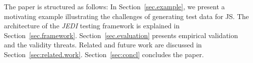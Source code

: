 The paper is structured as follows: In Section~\ref{sec.example}, we present a motivating example illustrating the challenges of generating test data for JS. The architecture of the \emph{JEDI} testing framework is explained in Section~\ref{sec.framework}. Section~\ref{sec.evaluation} presents empirical validation and the validity threats. Related and future work are discussed in Section~\ref{sec:related.work}. Section~\ref{sec:concl} concludes the paper.

